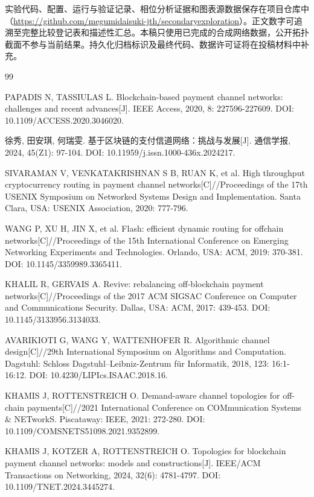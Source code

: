 \documentclass[UTF8,a4paper,twocolumn,fontset=none,zihao=5]{ctexart}
\begin{document}
实验代码、配置、运行与验证记录、相位分析证据和图表源数据保存在项目仓库中（\url{https://github.com/megumidaisuki-jth/secondaryexploration}）。正文数字可追溯至完整比较登记表和描述性汇总。本稿只使用已完成的合成网络数据，公开拓扑截面不参与当前结果。持久化归档标识及最终代码、数据许可证将在投稿材料中补充。


\begin{thebibliography}{99}\small\raggedright\setlength{\itemsep}{2pt}

 PAPADIS N, TASSIULAS L. Blockchain-based payment channel networks: challenges and recent advances[J]. IEEE Access, 2020, 8: 227596-227609. DOI: 10.1109/ACCESS.2020.3046020.

 徐秀, 田安琪, 何瑞雯. 基于区块链的支付信道网络：挑战与发展[J]. 通信学报, 2024, 45(Z1): 97-104. DOI: 10.11959/j.issn.1000-436x.2024217.

 SIVARAMAN V, VENKATAKRISHNAN S B, RUAN K, et al. High throughput cryptocurrency routing in payment channel networks[C]//Proceedings of the 17th USENIX Symposium on Networked Systems Design and Implementation. Santa Clara, USA: USENIX Association, 2020: 777-796.

 WANG P, XU H, JIN X, et al. Flash: efficient dynamic routing for offchain networks[C]//Proceedings of the 15th International Conference on Emerging Networking Experiments and Technologies. Orlando, USA: ACM, 2019: 370-381. DOI: 10.1145/3359989.3365411.

 KHALIL R, GERVAIS A. Revive: rebalancing off-blockchain payment networks[C]//Proceedings of the 2017 ACM SIGSAC Conference on Computer and Communications Security. Dallas, USA: ACM, 2017: 439-453. DOI: 10.1145/3133956.3134033.

 AVARIKIOTI G, WANG Y, WATTENHOFER R. Algorithmic channel design[C]//29th International Symposium on Algorithms and Computation. Dagstuhl: Schloss Dagstuhl–Leibniz-Zentrum für Informatik, 2018, 123: 16:1-16:12. DOI: 10.4230/LIPIcs.ISAAC.2018.16.

 KHAMIS J, ROTTENSTREICH O. Demand-aware channel topologies for off-chain payments[C]//2021 International Conference on COMmunication Systems \& NETworkS. Piscataway: IEEE, 2021: 272-280. DOI: 10.1109/COMSNETS51098.2021.9352899.

 KHAMIS J, KOTZER A, ROTTENSTREICH O. Topologies for blockchain payment channel networks: models and constructions[J]. IEEE/ACM Transactions on Networking, 2024, 32(6): 4781-4797. DOI: 10.1109/TNET.2024.3445274.


\end{thebibliography}
\end{document}
